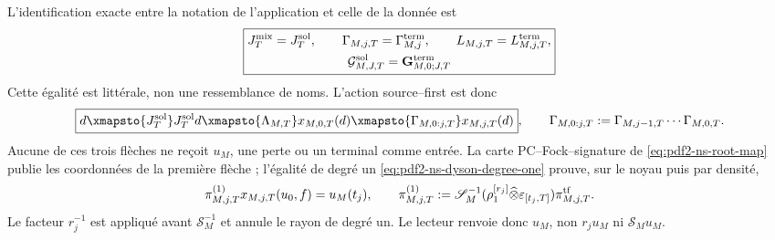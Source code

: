 L'identification exacte entre la notation de l'application et celle de la donnée est
\begin{equation}\label{eq:pdf2-ns-exact-datum-identification}
 \boxed{\begin{gathered}
 J_T^{\rm mix}=J_T^{\rm sol},\qquad
 \Gamma_{M,j,T}=\Gamma_{M,j}^{\rm term},\qquad
 L_{M,j,T}=L_{M,j,T}^{\rm term},\\
 \mathcal G_{M,J,T}^{\rm sol}=\mathbf G_{M,0;J,T}^{\rm term}
 \end{gathered}}
\end{equation}
Cette égalité est littérale, non une ressemblance de noms. L'action source--first
est donc
\begin{equation}\label{eq:pdf2-ns-source-encoder-action}
 \boxed{\begin{gathered}
 d\xmapsto{J_T^{\rm sol}}J_T^{\rm sol}d
 \xmapsto{\Lambda_{M,T}}x_{M,0,T}(d)
 \xmapsto{\Gamma_{M,0:j,T}}x_{M,j,T}(d)
 \end{gathered}},
 \qquad
 \Gamma_{M,0:j,T}:=\Gamma_{M,j-1,T}\cdots\Gamma_{M,0,T}.
\end{equation}
Aucune de ces trois flèches ne reçoit $u_M$, une perte ou un terminal comme
entrée. La carte PC--Fock--signature de
\eqref{eq:pdf2-ns-root-map} publie les coordonnées de la première flèche ;
l'égalité de degré un
\eqref{eq:pdf2-ns-dyson-degree-one} prouve, sur le noyau puis par densité,
\begin{equation}\label{eq:pdf2-ns-sol-transition-action}
 \pi_{M,j,T}^{(1)}x_{M,j,T}(u_0,f)=u_M(t_j),
 \qquad
 \pi_{M,j,T}^{(1)}:=
 \mathscr S_M^{-1}
 (\rho_1^{[r_j]}\widehat\otimes\varepsilon_{[t_j,T]})\pi_{M,j,T}^{\rm tf}.
\end{equation}
Le facteur $r_j^{-1}$ est appliqué avant $\mathscr S_M^{-1}$ et annule le rayon
de degré un. Le lecteur renvoie donc $u_M$, non $r_ju_M$ ni
$\mathscr S_Mu_M$.


